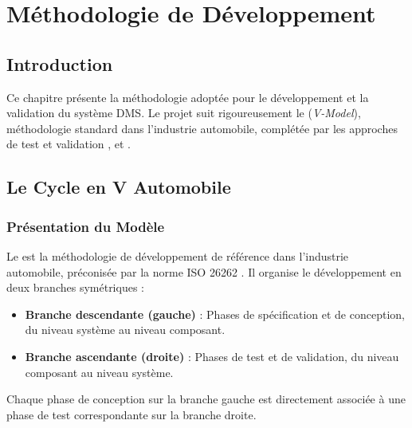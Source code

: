 
\chapter{Méthodologie de Développement}

\section{Introduction}

Ce chapitre présente la méthodologie adoptée pour le développement et la validation du système DMS. Le projet suit rigoureusement le  (\textit{V-Model}), méthodologie standard dans l'industrie automobile, complétée par les approches de test et validation ,  et .

\section{Le Cycle en V Automobile}

\subsection{Présentation du Modèle}

Le  est la méthodologie de développement de référence dans l'industrie automobile, préconisée par la norme ISO 26262 \cite{iso26262}. Il organise le développement en deux branches symétriques :

\begin{itemize}[leftmargin=2cm]
    \item \textbf{Branche descendante (gauche)} : Phases de spécification et de conception, du niveau système au niveau composant.
    \item \textbf{Branche ascendante (droite)} : Phases de test et de validation, du niveau composant au niveau système.
\end{itemize}

Chaque phase de conception sur la branche gauche est directement associée à une phase de test correspondante sur la branche droite.

